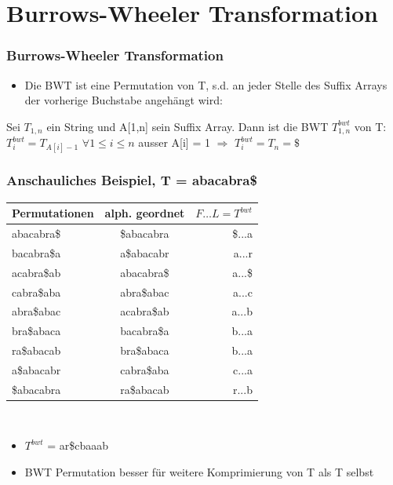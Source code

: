 \documentclass{beamer}
\begin{document}
\section{Burrows-Wheeler Transformation}
\begin{frame}
\frametitle{Burrows-Wheeler Transformation}
\begin{itemize}
\item Die BWT ist eine Permutation von T, s.d. an jeder Stelle des Suffix Arrays der vorherige Buchstabe angehängt wird:
\end{itemize}
\begin{Definition}
Sei $T_{1,n}$ ein String und A[1,n] sein Suffix Array. Dann ist die BWT $T_{1,n}^{bwt}$ von T: \newline $T_{i}^{bwt} = T_{A[i]-1}$ $\forall 1 \leq i \leq n$ ausser A[i] = 1 $\Rightarrow$ $T_{i}^{bwt} = T_n = \$ $
\end{Definition}
\end{frame}
\begin{frame}
\frametitle{Anschauliches Beispiel, T = \glqq abacabra\$\grqq}
\begin{tabular}{l<{\ttfamily} c<{\ttfamily} r<{\ttfamily}}
\textbf{Permutationen} & \textbf{alph. geordnet} & $F\ldots L = T^{bwt}$ \\\hline
abacabra\$ & \$abacabra & \$...a \\
bacabra\$a & a\$abacabr & a...r \\
acabra\$ab & abacabra\$ & a...\$ \\
cabra\$aba & abra\$abac & a...c \\
abra\$abac & acabra\$ab & a...b \\
bra\$abaca & bacabra\$a & b...a \\
ra\$abacab & bra\$abaca & b...a \\
a\$abacabr & cabra\$aba & c...a \\
\$abacabra & ra\$abacab & r...b \\
\end{tabular}\\[5mm]
\begin{itemize}
\item $T^{bwt}$ = ar\$cbaaab
\item BWT Permutation besser für weitere Komprimierung von T als T selbst
\end{itemize}
\end{frame}
\end{document}
